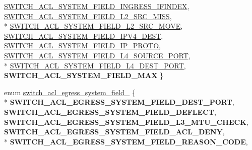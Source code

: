 \begin{DoxyCompactItemize}
\hyperlink{group__ACL_gga620cb3ced31cc813578d68b496991f0eaf67fbb66cc245348f1d621ef195aa1e7}{S\+W\+I\+T\+C\+H\+\_\+\+A\+C\+L\+\_\+\+S\+Y\+S\+T\+E\+M\+\_\+\+F\+I\+E\+L\+D\+\_\+\+I\+N\+G\+R\+E\+S\+S\+\_\+\+I\+F\+I\+N\+D\+E\+X}, 
\hyperlink{group__ACL_gga620cb3ced31cc813578d68b496991f0ea6fa5341a4b1ec7fa4fd36a75ccaf50bd}{S\+W\+I\+T\+C\+H\+\_\+\+A\+C\+L\+\_\+\+S\+Y\+S\+T\+E\+M\+\_\+\+F\+I\+E\+L\+D\+\_\+\+L2\+\_\+\+S\+R\+C\+\_\+\+M\+I\+S\+S}, 
\\*
\hyperlink{group__ACL_gga620cb3ced31cc813578d68b496991f0eaf5e25fdf82d1530a7c8fbdfb4257a9e7}{S\+W\+I\+T\+C\+H\+\_\+\+A\+C\+L\+\_\+\+S\+Y\+S\+T\+E\+M\+\_\+\+F\+I\+E\+L\+D\+\_\+\+L2\+\_\+\+S\+R\+C\+\_\+\+M\+O\+V\+E}, 
\hyperlink{group__ACL_gga620cb3ced31cc813578d68b496991f0ea362c468271ef4df13a18650028fd61c6}{S\+W\+I\+T\+C\+H\+\_\+\+A\+C\+L\+\_\+\+S\+Y\+S\+T\+E\+M\+\_\+\+F\+I\+E\+L\+D\+\_\+\+I\+P\+V4\+\_\+\+D\+E\+S\+T}, 
\hyperlink{group__ACL_gga620cb3ced31cc813578d68b496991f0ea1be9b652945f44d8b0cb32b068c4bf78}{S\+W\+I\+T\+C\+H\+\_\+\+A\+C\+L\+\_\+\+S\+Y\+S\+T\+E\+M\+\_\+\+F\+I\+E\+L\+D\+\_\+\+I\+P\+\_\+\+P\+R\+O\+T\+O}, 
\hyperlink{group__ACL_gga620cb3ced31cc813578d68b496991f0eaf1efe169340405186a4cb440fcc2f9cf}{S\+W\+I\+T\+C\+H\+\_\+\+A\+C\+L\+\_\+\+S\+Y\+S\+T\+E\+M\+\_\+\+F\+I\+E\+L\+D\+\_\+\+L4\+\_\+\+S\+O\+U\+R\+C\+E\+\_\+\+P\+O\+R\+T}, 
\\*
\hyperlink{group__ACL_gga620cb3ced31cc813578d68b496991f0ea888d02509fffe24566d5d46b540f16ee}{S\+W\+I\+T\+C\+H\+\_\+\+A\+C\+L\+\_\+\+S\+Y\+S\+T\+E\+M\+\_\+\+F\+I\+E\+L\+D\+\_\+\+L4\+\_\+\+D\+E\+S\+T\+\_\+\+P\+O\+R\+T}, 
{\bfseries S\+W\+I\+T\+C\+H\+\_\+\+A\+C\+L\+\_\+\+S\+Y\+S\+T\+E\+M\+\_\+\+F\+I\+E\+L\+D\+\_\+\+M\+A\+X}
 \}
\item 
enum \hyperlink{group__ACL_ga2edc038cd515df04ca1426513fef2cf0}{switch\+\_\+acl\+\_\+egress\+\_\+system\+\_\+field\+\_\+} \{ \\*
{\bfseries S\+W\+I\+T\+C\+H\+\_\+\+A\+C\+L\+\_\+\+E\+G\+R\+E\+S\+S\+\_\+\+S\+Y\+S\+T\+E\+M\+\_\+\+F\+I\+E\+L\+D\+\_\+\+D\+E\+S\+T\+\_\+\+P\+O\+R\+T}, 
{\bfseries S\+W\+I\+T\+C\+H\+\_\+\+A\+C\+L\+\_\+\+E\+G\+R\+E\+S\+S\+\_\+\+S\+Y\+S\+T\+E\+M\+\_\+\+F\+I\+E\+L\+D\+\_\+\+D\+E\+F\+L\+E\+C\+T}, 
{\bfseries S\+W\+I\+T\+C\+H\+\_\+\+A\+C\+L\+\_\+\+E\+G\+R\+E\+S\+S\+\_\+\+S\+Y\+S\+T\+E\+M\+\_\+\+F\+I\+E\+L\+D\+\_\+\+L3\+\_\+\+M\+T\+U\+\_\+\+C\+H\+E\+C\+K}, 
{\bfseries S\+W\+I\+T\+C\+H\+\_\+\+A\+C\+L\+\_\+\+E\+G\+R\+E\+S\+S\+\_\+\+S\+Y\+S\+T\+E\+M\+\_\+\+F\+I\+E\+L\+D\+\_\+\+A\+C\+L\+\_\+\+D\+E\+N\+Y}, 
\\*
{\bfseries S\+W\+I\+T\+C\+H\+\_\+\+A\+C\+L\+\_\+\+E\+G\+R\+E\+S\+S\+\_\+\+S\+Y\+S\+T\+E\+M\+\_\+\+F\+I\+E\+L\+D\+\_\+\+R\+E\+A\+S\+O\+N\+\_\+\+C\+O\+D\+E}, 

\end{DoxyCompactItemize}
